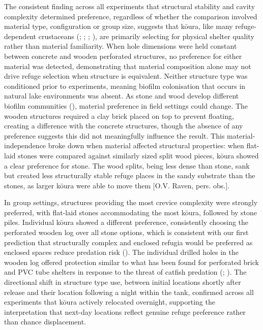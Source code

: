 \documentclass[
  letterpaper,
  DIV=11,
  numbers=noendperiod]{scrartcl}
\begin{document}
The consistent finding across all experiments that structural stability
and cavity complexity determined preference, regardless of whether the
comparison involved material type, configuration or group size, suggests
that kōura, like many refuge-dependent crustaceans
(;
;
;
), are primarily
selecting for physical shelter quality rather than material familiarity.
When hole dimensions were held constant between concrete and wooden
perforated structures, no preference for either material was detected,
demonstrating that material composition alone may not drive refuge
selection when structure is equivalent. Neither structure type was
conditioned prior to experiments, meaning biofilm colonisation that
occurs in natural lake environments was absent. As stone and wood
develop different biofilm communities (), material preference in field settings could change.
The wooden structures required a clay brick placed on top to prevent
floating, creating a difference with the concrete structures, though the
absence of any preference suggests this did not meaningfully influence
the result. This material-independence broke down when material affected
structural properties: when flat-laid stones were compared against
similarly sized split wood pieces, kōura showed a clear preference for
stone. The wood splits, being less dense than stone, sank but created
less structurally stable refuge places in the sandy substrate than the
stones, as larger kōura were able to move them {[}O.V. Raven, pers.
obs.{]}.

In group settings, structures providing the most crevice complexity were
strongly preferred, with flat-laid stones accommodating the most kōura,
followed by stone piles. Individual kōura showed a different preference,
consistently choosing the perforated wooden log over all stone options,
which is consistent with our first prediction that structurally complex
and enclosed refugia would be preferred as enclosed spaces reduce
predation risk ().
The individual drilled holes in the wooden log offered protection
similar to what has been found for perforated brick and PVC tube
shelters in response to the threat of catfish predation
(; ). The directional shift in structure type use,
between initial locations shortly after release and their location
following a night within the tank, confirmed across all experiments that
kōura actively relocated overnight, supporting the interpretation that
next-day locations reflect genuine refuge preference rather than chance
displacement.
\end{document}
